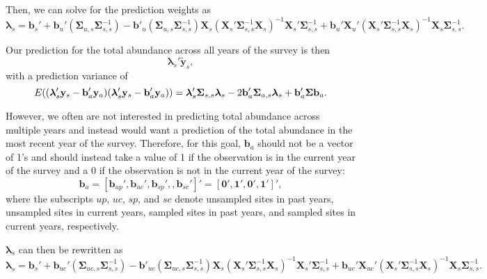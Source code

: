 \documentclass[]{interact}
\theoremstyle{plain}%
\theoremstyle{definition}
\theoremstyle{remark}
\begin{document}
Then, we can solve for the prediction weights as \mbox{}
\begin{equation}
\bm{\lambda}_s = \mathbf{b}_{s}' + \mathbf{b}_{u}' (\bm{\Sigma}_{u, s}\bm{\Sigma}_{s, s}^{-1}) - \mathbf{b}'_{u}(\bm{\Sigma}_{u, s} \bm{\Sigma}_{s, s}^{-1})\mathbf{X}_s(\mathbf{X}_s'\bm{\Sigma}_{s, s}^{-1}\mathbf{X}_s)^{-1}\mathbf{X}_s'\bm{\Sigma}_{s, s}^{-1} + \mathbf{b}_{u}' \mathbf{X}_{u}'(\mathbf{X}_s'\bm{\Sigma}_{s, s}^{-1}\mathbf{X}_s)^{-1}\mathbf{X}_s \bm{\Sigma}_{s, s}^{-1}.
\end{equation}

Our prediction for the total abundance across all years of the survey is
then \mbox{} \begin{equation}
\bm{\lambda}_s' \mathbf{\tilde{y}}_s,
\end{equation} \noindent with a prediction variance of \mbox{}
\begin{equation}
E((\bm{\lambda}_s'\mathbf{y}_s - \mathbf{b}_a'\mathbf{y}_a)(\bm{\lambda}_s'\mathbf{y}_s - \mathbf{b}_a'\mathbf{y}_a)) = \\
\bm{\lambda}_s'\bm{\Sigma}_{s, s}\bm{\lambda}_s - 2 \mathbf{b}_a' \bm{\Sigma}_{a ,s} \bm{\lambda}_s + \mathbf{b}_a' \bm{\Sigma}\mathbf{b}_a.
\end{equation}

However, we often are not interested in predicting total abundance
across multiple years and instead would want a prediction of the total
abundance in the most recent year of the survey. Therefore, for this
goal, \(\mathbf{b}_a\) should not be a vector of 1's and should instead
take a value of 1 if the observation is in the current year of the
survey and a 0 if the observation is not in the current year of the
survey: \mbox{} \begin{equation}
\mathbf{b}_a = [\mathbf{b}_{up}', \mathbf{b}_{uc}', \mathbf{b}_{sp}', , \mathbf{b}_{sc}']' = [\mathbf{0}', \mathbf{1}', \mathbf{0}', \mathbf{1}']',
\end{equation} \noindent where the subscripts \(up\), \(uc\), \(sp\),
and \(sc\) denote unsampled sites in past years, unsampled sites in
current years, sampled sites in past years, and sampled sites in current
years, respectively.

\(\bm{\lambda}_s\) can then be rewritten as \mbox{} \begin{equation}
\bm{\lambda}_s = \mathbf{b}_{s}' + \mathbf{b}_{uc}' (\bm{\Sigma}_{uc, s}\bm{\Sigma}_{s, s}^{-1}) - \mathbf{b}'_{uc}(\bm{\Sigma}_{uc, s} \bm{\Sigma}_{s, s}^{-1})\mathbf{X}_s(\mathbf{X}_s'\bm{\Sigma}_{s, s}^{-1}\mathbf{X}_s)^{-1}\mathbf{X}_s'\bm{\Sigma}_{s, s}^{-1} + \mathbf{b}_{uc}' \mathbf{X}_{uc}'(\mathbf{X}_s'\bm{\Sigma}_{s, s}^{-1}\mathbf{X}_s)^{-1}\mathbf{X}_s \bm{\Sigma}_{s, s}^{-1}.
\end{equation}
\end{document}
